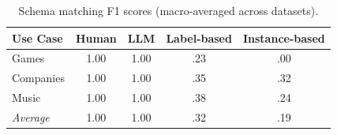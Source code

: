 
\begin{table}[t]
\caption{Schema matching F1 scores (macro-averaged across datasets).}
\label{tab:sm_results}
\centering
\footnotesize
\begin{tabular}{@{}lcccc@{}}
\toprule
\textbf{Use Case} & \textbf{Human} & \textbf{LLM} & \textbf{Label-based} & \textbf{Instance-based} \\
\midrule
Games & 1.00 & 1.00 & .23 & .00 \\
Companies & 1.00 & 1.00 & .35 & .32 \\
Music & 1.00 & 1.00 & .38 & .24 \\
\midrule
\textit{Average} & 1.00 & 1.00 & .32 & .19 \\
\bottomrule
\end{tabular}
\end{table}
